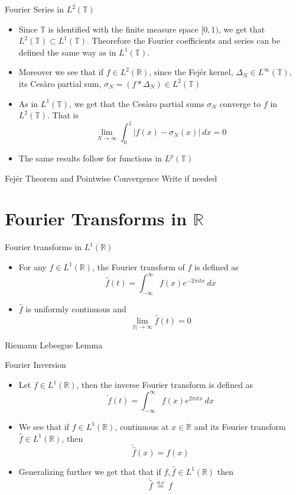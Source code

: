 \documentclass[compress]{beamer}
\newcommand{\R}{\mathbb R}
\newcommand{\T}{\mathbb T}
\begin{document}
\begin{frame}{Fourier Series in $L^2(\T)$}
  \begin{itemize}
    \item Since $\T$ is identified with the finite measure space $[0, 1)$, we get that $L^2(\T) \subset L^1(\T)$. Theorefore the Fourier coefficients and series can be defined the same way as in $L^1(\T)$.
    \item Moreover we see that if $f \in L^2(\R)$, since the Fej\'er kernel, $\Delta_N \in L^\infty(\T)$, its Ces\`aro partial sum, $\sigma_N = (f*\Delta_N) \in L^2(\T)$
    \item As in $L^1(\T)$, we get that the Ces\`aro partial sums $\sigma_N$ converge to $f$ in $L^2(\T)$. That is $$\lim_{N\to \infty} \int_0^1 \left| f(x) - \sigma_N(x)\right| \ dx  = 0 $$
    \item The same results follow for functions in $L^p(\T)$
  \end{itemize}
\end{frame}

\begin{frame}{Fej\'er Theorem and Pointwise Convergence}
  Write if needed
\end{frame}

\section{Fourier Transforms in $\R$}

\begin{frame}{Fourier transforms in $L^1(\R)$}
  \begin{itemize}
    \item For any $f\in L^1(\R)$, the Fourier transform of $f$ is defined as $$\hat{f}(t) = \int_{-\infty}^{\infty} f(x)e^{-2\pi i t x} \ dx $$
    \item $\hat{f}$ is uniformly continuous and $$\lim_{|t| \to \infty} \hat{f}(t) = 0$$
  \end{itemize}
\end{frame}

\begin{frame}{Riemann Lebesgue Lemma}
\end{frame}

\begin{frame}{Fourier Inversion}
  \begin{itemize}
    \item Let $f \in L^1(\R)$, then the inverse Fourier transform is defined as $$\check{f}(t) = \int_{-\infty}^\infty f(x)e^{2\pi itx} \ dx$$
    \item We see that if $f \in L^1(\R)$, continuous at $x \in \R$ and its Fourier transform $\hat{f} \in L^1(\R)$, then $$\check{\hat{f}}(x) = f(x)$$
    \item Generalizing further we get that that if $f, \hat{f} \in L^1(\R)$ then $$\check{\hat{f}} \ \stackrel{a.e}{=} \ f$$
  \end{itemize}
\end{frame}
\end{document}
